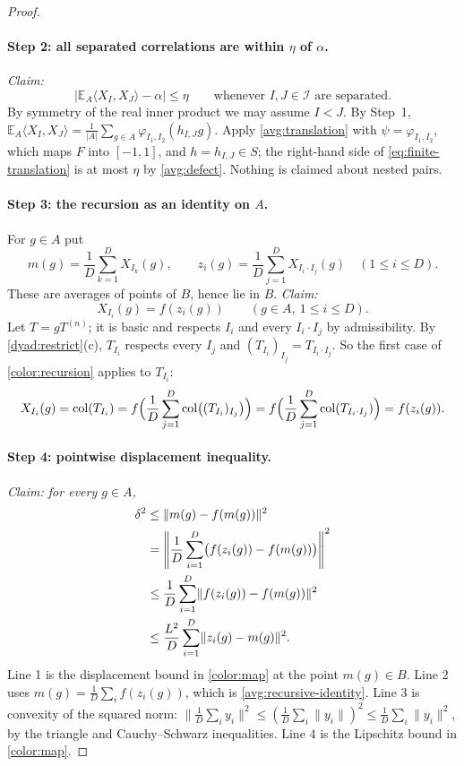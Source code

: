 \documentclass[11pt]{article}
\newcommand{\norm}[1]{\lVert #1\rVert}
\newcommand{\ip}[2]{\langle #1,#2\rangle}
\DeclareMathOperator{\colr}{col}
\theoremstyle{definition}
\numberwithin{equation}{section}
\begin{document}
\begin{proof}
\paragraph{Step 2: all separated correlations are within \(\eta\) of \(\alpha\).}
\emph{Claim:}
\begin{equation}\label{avg:correlation}
  \left|\mathbb E_A\ip{X_I}{X_J}-\alpha\right|
       \leq\eta
  \qquad\text{whenever $I,J\in\mathcal I$ are separated}.
\end{equation}
By symmetry of the real inner product we may assume \(I<J\). By Step~1,
\(\mathbb E_A\ip{X_I}{X_J}=\frac1{|A|}\sum_{g\in A}\varphi_{I_1,I_2}(h_{I,J}g)\).
Apply \cref{avg:translation} with \(\psi=\varphi_{I_1,I_2}\), which maps \(F\)
into \([-1,1]\), and \(h=h_{I,J}\in S\); the right-hand side of
\eqref{eq:finite-translation} is at most \(\eta\) by \eqref{avg:defect}.
Nothing is claimed about nested pairs.

\paragraph{Step 3: the recursion as an identity on \(A\).}
For \(g\in A\) put
\[
  m(g)=\frac1D\sum_{k=1}^D X_{I_k}(g),\qquad
  z_i(g)=\frac1D\sum_{j=1}^D X_{I_i\cdot I_j}(g)
       \quad(1\leq i\leq D).
\]
These are averages of points of \(B\), hence lie in \(B\). \emph{Claim:}
\begin{equation}\label{avg:recursive-identity}
  X_{I_i}(g)=f(z_i(g))\qquad(g\in A,\ 1\leq i\leq D).
\end{equation}
Let \(T=gT^{(n)}\); it is basic and respects \(I_i\) and every
\(I_i\cdot I_j\) by admissibility. By \cref{dyad:restrict}(c), \(T_{I_i}\)
respects every \(I_j\) and \((T_{I_i})_{I_j}=T_{I_i\cdot I_j}\). So the first
case of \eqref{color:recursion} applies to \(T_{I_i}\):
\[
 X_{I_i}(g)=\colr(T_{I_i})
 =f\Bigl(\frac1D\sum_{j=1}^D\colr\bigl((T_{I_i})_{I_j}\bigr)\Bigr)
 =f\Bigl(\frac1D\sum_{j=1}^D\colr(T_{I_i\cdot I_j})\Bigr)
 =f(z_i(g)).
\]

\paragraph{Step 4: pointwise displacement inequality.}
\emph{Claim: for every \(g\in A\),}
\begin{align}
  \delta^2
  &\leq\norm{m(g)-f(m(g))}^2\notag\\
  &=\left\|\frac1D\sum_{i=1}^D
                   \bigl(f(z_i(g))-f(m(g))\bigr)\right\|^2\notag\\
  &\leq\frac1D\sum_{i=1}^D
                   \norm{f(z_i(g))-f(m(g))}^2\notag\\
  &\leq\frac{L^2}{D}\sum_{i=1}^D\norm{z_i(g)-m(g)}^2.
       \label{avg:displacement}
\end{align}
Line 1 is the displacement bound in \eqref{color:map} at the point
\(m(g)\in B\). Line 2 uses \(m(g)=\frac1D\sum_i f(z_i(g))\), which is
\eqref{avg:recursive-identity}. Line 3 is convexity of the squared norm:
\(\norm{\frac1D\sum_iy_i}^2\le(\frac1D\sum_i\norm{y_i})^2
\le\frac1D\sum_i\norm{y_i}^2\), by the triangle and Cauchy--Schwarz
inequalities. Line 4 is the Lipschitz bound in \eqref{color:map}.


\end{proof}
\end{document}
